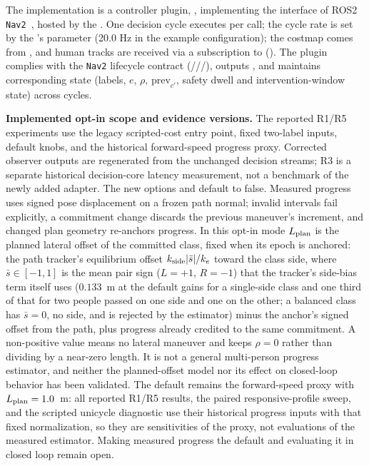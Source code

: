 The implementation is a controller plugin, , implementing the  interface of ROS2 \texttt{Nav2}~\citep{macenski2020nav2}, hosted by the . One decision cycle executes per  call; the cycle rate is set by the 's  parameter (20.0 Hz in the example configuration); the costmap comes from , and human tracks are received via a subscription to  (). The plugin complies with the \texttt{Nav2} lifecycle contract (///), outputs , and maintains corresponding state (labels, $e$, $\rho$, $\text{prev}_{c'}$, safety dwell and intervention-window state) across cycles.

\noindent\textbf{Implemented opt-in scope and evidence versions.} The reported R1/R5 experiments use the legacy scripted-cost entry point, fixed two-label inputs, default knobs, and the historical forward-speed progress proxy. Corrected observer outputs are regenerated from the unchanged decision streams; R3 is a separate historical decision-core latency measurement, not a benchmark of the newly added adapter. The new options  and  default to false. Measured progress uses signed pose displacement on a frozen path normal; invalid intervals fail explicitly, a commitment change discards the previous maneuver's increment, and changed plan geometry re-anchors progress. In this opt-in mode $L_{\rm plan}$ is the planned lateral offset of the committed class, fixed when its epoch is anchored: the path tracker's equilibrium offset $k_{\rm side}|\bar s|/k_e$ toward the class side, where $\bar s\in[-1,1]$ is the mean pair sign ($L=+1$, $R=-1$) that the tracker's side-bias term itself uses ($0.133$~m at the default gains for a single-side class and one third of that for two people passed on one side and one on the other; a balanced class has $\bar s=0$, no side, and is rejected by the estimator) minus the anchor's signed offset from the path, plus progress already credited to the same commitment. A non-positive value means no lateral maneuver and keeps $\rho=0$ rather than dividing by a near-zero length. It is not a general multi-person progress estimator, and neither the planned-offset model nor its effect on closed-loop behavior has been validated. The default remains the forward-speed proxy with $L_{\rm plan}=1.0$~m: all reported R1/R5 results, the paired responsive-profile sweep, and the scripted unicycle diagnostic use their historical progress inputs with that fixed normalization, so they are sensitivities of the proxy, not evaluations of the measured estimator. Making measured progress the default and evaluating it in closed loop remain open.

